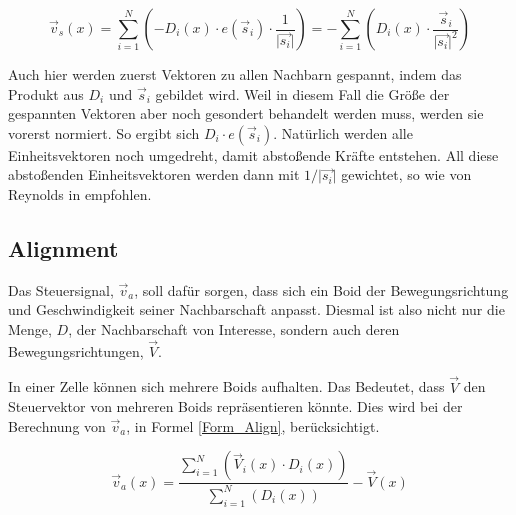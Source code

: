 \documentclass[a4paper, 10pt, journal]{wissarbIEEE}      %
\newcommand{\length}[1]{\lvert \vec{#1} \rvert}
\begin{document}
\begin{equation}
\vec{v}_s(x) = \sum_{i=1}^N (-D_i(x) \cdot e(\vec{s}_i) \cdot \frac{1}{\length{s_i}}) = - \sum_{i=1}^N(D_i(x) \cdot \frac{\vec{s}_i}{\length{s_i}^2})
\label{Form_Separation}
\end{equation}

Auch hier werden zuerst Vektoren zu allen Nachbarn gespannt, indem das Produkt aus $D_i$ und $\vec{s}_i$ gebildet wird. Weil in diesem Fall die Größe der gespannten Vektoren aber noch gesondert behandelt werden muss, werden sie vorerst normiert. So ergibt sich $D_i \cdot e(\vec{s}_i)$. 
Natürlich werden alle Einheitsvektoren noch umgedreht, damit abstoßende Kräfte entstehen. All diese abstoßenden Einheitsvektoren werden dann mit $1/ \length{s_i}$ gewichtet, so wie von Reynolds in \cite{Reynolds99steeringbehaviors} empfohlen. 

\subsection{Alignment}
\label{subsec_Ausrichtung}

Das Steuersignal, $\vec{v}_a$, soll dafür sorgen, dass sich ein Boid der Bewegungsrichtung und Geschwindigkeit seiner Nachbarschaft anpasst. Diesmal ist also nicht nur die Menge, $D$, der Nachbarschaft von Interesse, sondern auch deren Bewegungsrichtungen, $\vec{V}$.




In einer Zelle können sich mehrere Boids aufhalten. Das Bedeutet, dass $\vec{V}$ den Steuervektor von mehreren Boids repräsentieren könnte. Dies wird bei der Berechnung von $\vec{v}_a$, in Formel \ref{Form_Align}, berücksichtigt.

\begin{equation}
\vec{v}_a(x) = \dfrac{\sum_{i=1}^N(\vec{V}_i(x) \cdot D_i(x))}{\sum_{i=1}^N(D_i(x))} - \vec{V}(x)
\label{Form_Align}
\end{equation}
\end{document}
